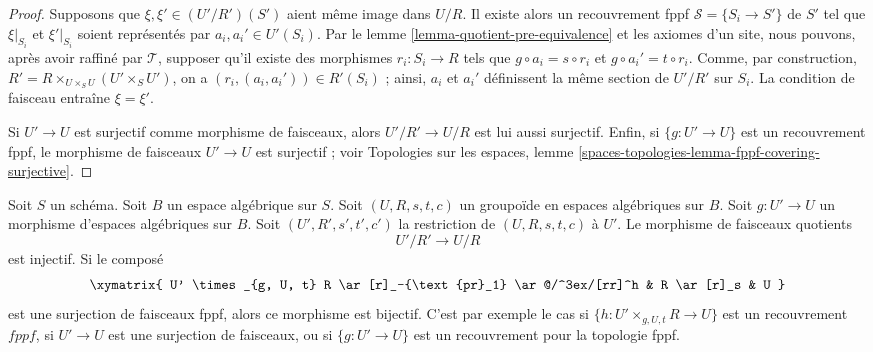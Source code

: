 \begin{proof}
Supposons que $\xi, \xi' \in (U'/R')(S')$ aient même image dans $U/R$. Il existe alors un recouvrement fppf $\mathcal{S} = \{S_i \to S'\}$ de $S'$ tel que $\xi|_{S_i}$ et $\xi'|_{S_i}$ soient représentés par $a_i, a_i' \in U'(S_i)$. Par le lemme \ref{lemma-quotient-pre-equivalence} et les axiomes d'un site, nous pouvons, après avoir raffiné par $\mathcal{T}$, supposer qu'il existe des morphismes $r_i : S_i \to R$ tels que $g \circ a_i = s \circ r_i$ et $g \circ a_i' = t \circ r_i$. Comme, par construction, $R' = R \times_{U \times_S U} (U' \times_S U')$, on a $(r_i, (a_i, a_i')) \in R'(S_i)$ ; ainsi, $a_i$ et $a_i'$ définissent la même section de $U'/R'$ sur $S_i$. La condition de faisceau entraîne $\xi = \xi'$.

\medskip\noindent
Si $U' \to U$ est surjectif comme morphisme de faisceaux, alors $U'/R' \to U/R$ est lui aussi surjectif. Enfin, si $\{g : U' \to U\}$ est un recouvrement fppf, le morphisme de faisceaux $U' \to U$ est surjectif ; voir Topologies sur les espaces, lemme \ref{spaces-topologies-lemma-fppf-covering-surjective}.
\end{proof}

\begin{lemma}
\label{lemma-quotient-groupoid-restrict}
Soit $S$ un schéma. Soit $B$ un espace algébrique sur $S$. Soit $(U, R, s, t, c)$ un groupoïde en espaces algébriques sur $B$. Soit $g : U' \to U$ un morphisme d'espaces algébriques sur $B$. Soit $(U', R', s', t', c')$ la restriction de $(U, R, s, t, c)$ à $U'$. Le morphisme de faisceaux quotients
$$
U'/R' \longrightarrow U/R
$$
est injectif. Si le composé
$$
\xymatrix{
U' \times_{g, U, t} R \ar[r]_-{\text{pr}_1} \ar@/^3ex/[rr]^h
& R \ar[r]_s & U
}
$$
est une surjection de faisceaux fppf, alors ce morphisme est bijectif. C'est par exemple le cas si $\{h : U' \times_{g, U, t} R \to U\}$ est un recouvrement $fppf$, si $U' \to U$ est une surjection de faisceaux, ou si $\{g : U' \to U\}$ est un recouvrement pour la topologie fppf.
\end{lemma}

